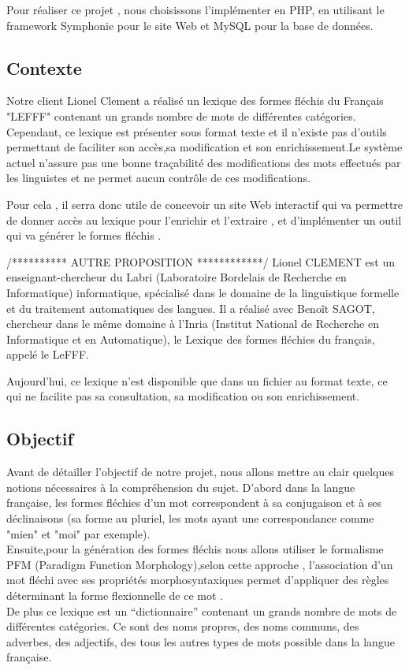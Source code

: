 \documentclass[12pt,a4paper]{article}
\begin{document}
Pour réaliser ce projet , nous choisissons l’implémenter en PHP, en utilisant le framework Symphonie pour le site Web et MySQL pour la base de données.
\subsection{Contexte}

\smallbreak 

Notre client Lionel Clement a réalisé un lexique des formes fléchis du Français "LEFFF"  contenant un grands nombre de mots de différentes catégories. Cependant, ce lexique est présenter sous format texte et il n'existe pas d'outils permettant de faciliter son accès,sa modification et son enrichissement.Le système actuel n'assure pas une bonne traçabilité des modifications des mots effectués par les linguistes et ne permet aucun contrôle de ces modifications.

Pour cela , il serra donc utile de concevoir un site Web interactif qui va permettre de donner accès au lexique pour l'enrichir et l'extraire , et d'implémenter un outil qui va générer le formes fléchis .

/********** AUTRE PROPOSITION ************/
Lionel CLEMENT est un enseignant-chercheur du Labri (Laboratoire Bordelais de Recherche en Informatique) informatique, spécialisé dans le domaine de la linguistique formelle et du traitement automatiques des langues. Il a réalisé avec Benoît SAGOT, chercheur dans le même domaine à l'Inria (Institut National de Recherche en Informatique et en Automatique), le Lexique des formes fléchies du français, appelé le LeFFF.

Aujourd'hui, ce lexique n'est disponible que dans un fichier au format texte, ce qui ne facilite pas sa consultation, sa modification ou son enrichissement.

\subsection{Objectif}

Avant de détailler l'objectif de notre projet, nous allons mettre
au clair quelques notions nécessaires à la compréhension du sujet. 
D'abord dans la langue française, les formes fléchies d'un mot correspondent à sa conjugaison et à ses déclinaisons (sa forme au pluriel, les mots ayant une correspondance comme "mien" et "moi" par exemple).\\
Ensuite,pour la génération des formes fléchis nous allons utiliser le formalisme PFM (Paradigm Function Morphology),selon cette approche , l'association d'un mot  fléchi avec ses propriétés morphosyntaxiques permet d'appliquer des règles déterminant la forme flexionnelle de ce mot .\\
De plus ce lexique est un “dictionnaire” contenant un grands nombre de mots de différentes catégories. Ce sont des noms propres, des noms communs, des adverbes, des adjectifs, des tous les autres types de mots possible dans la langue française. 
\end{document}
